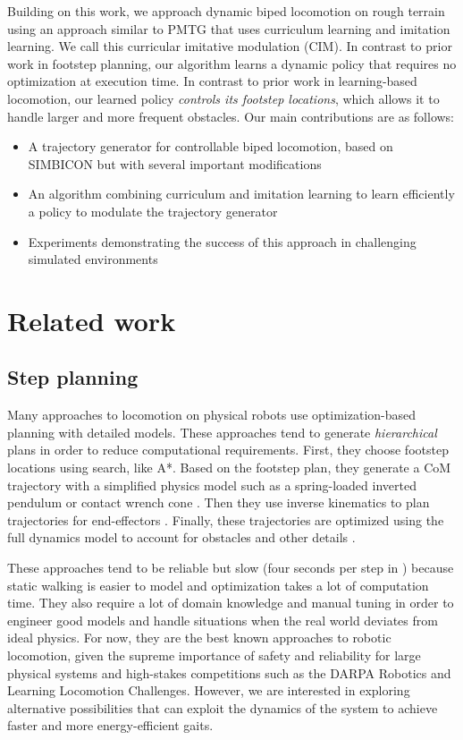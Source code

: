\documentclass[a4paper]{article}
\begin{document}
Building on this work, we approach dynamic biped locomotion on rough terrain using an approach similar to PMTG that uses curriculum learning and imitation learning.
We call this curricular imitative modulation (CIM).
In contrast to prior work in footstep planning, our algorithm learns a dynamic policy that requires no optimization at execution time.
In contrast to prior work in learning-based locomotion, our learned policy \emph{controls its footstep locations}, which allows it to handle larger and more frequent obstacles.
Our main contributions are as follows:
\begin{itemize}
  \item A trajectory generator for controllable biped locomotion, based on SIMBICON \citep{yin2007simbicon} but with several important modifications
  \item An algorithm combining curriculum and imitation learning to learn efficiently a policy to modulate the trajectory generator
  \item Experiments demonstrating the success of this approach in challenging simulated environments
\end{itemize}

\section{Related work}

\subsection{Step planning}

Many approaches to locomotion on physical robots use optimization-based planning with detailed models.
These approaches tend to generate \emph{hierarchical} plans in order to reduce computational requirements.
First, they choose footstep locations using search, like A*.
Based on the footstep plan, they generate a CoM trajectory with a simplified physics model such as a spring-loaded inverted pendulum \citep{mordatch2010robust} or contact wrench cone \citep{dai2016planning}.
Then they use inverse kinematics to plan trajectories for end-effectors \citep{zucker2010optimization}.
Finally, these trajectories are optimized using the full dynamics model to account for obstacles and other details \citep{ratliff2009chomp}.

These approaches tend to be reliable but slow (four seconds per step in \citet{feng2015optimization}) because static walking is easier to model and optimization takes a lot of computation time.
They also require a lot of domain knowledge and manual tuning in order to engineer good models and handle situations when the real world deviates from ideal physics.
For now, they are the best known approaches to robotic locomotion, given the supreme importance of safety and reliability for large physical systems and high-stakes competitions such as the DARPA Robotics and Learning Locomotion Challenges.
However, we are interested in exploring alternative possibilities that can exploit the dynamics of the system to achieve faster and more energy-efficient gaits.
\end{document}
